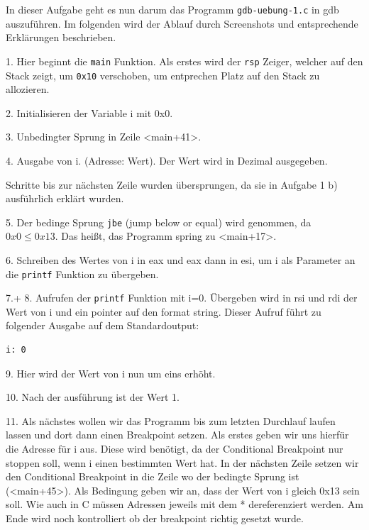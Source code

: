 \documentclass[12pt]{article}
\begin{document}
In dieser Aufgabe geht es nun darum das Programm \texttt{gdb-uebung-1.c} in gdb auszuführen. Im folgenden wird der Ablauf durch Screenshots und entsprechende Erklärungen beschrieben.



1. Hier beginnt die \texttt{main} Funktion. Als erstes wird der \texttt{rsp} Zeiger, welcher auf den Stack zeigt, um \texttt{0x10} verschoben, um entprechen Platz auf den Stack zu allozieren.


2. Initialisieren der Variable i  mit 0x0.


3. Unbedingter Sprung in Zeile <main+41>.


4. Ausgabe von i. (Adresse: Wert). Der Wert wird in Dezimal ausgegeben.

Schritte bis zur nächsten Zeile wurden übersprungen, da sie in Aufgabe 1 b) ausführlich erklärt wurden.


5. Der bedinge Sprung \texttt{jbe} (jump below or equal) wird genommen, da $ 0x0 \le 0x13$. Das heißt, das Programm spring zu <main+17>.


6. Schreiben des Wertes von i in eax und eax dann in esi, um i als Parameter an die \texttt{printf} Funktion zu übergeben.


7.+ 8. Aufrufen der \texttt{printf} Funktion mit i=0. Übergeben wird in rsi und rdi der Wert von i und ein pointer auf den format string. Dieser Aufruf führt zu folgender Ausgabe auf dem Standardoutput:

\begin{lstlisting}
i: 0
\end{lstlisting}


9. Hier wird der Wert von i nun um eins erhöht.


10. Nach der ausführung ist der Wert 1.


11. Als nächstes wollen wir das Programm bis zum letzten Durchlauf laufen lassen und dort dann einen Breakpoint setzen. Als erstes geben wir uns hierfür die Adresse für i aus. Diese wird benötigt, da der Conditional Breakpoint nur stoppen soll, wenn i einen bestimmten Wert hat. In der nächsten Zeile setzen wir den Conditional Breakpoint in die Zeile wo der bedingte Sprung ist (<main+45>). Als Bedingung geben wir an, dass der Wert von i gleich 0x13 sein soll. Wie auch in C müssen Adressen jeweils mit dem * dereferenziert werden. Am Ende wird noch kontrolliert ob der breakpoint richtig gesetzt wurde.
\end{document}
